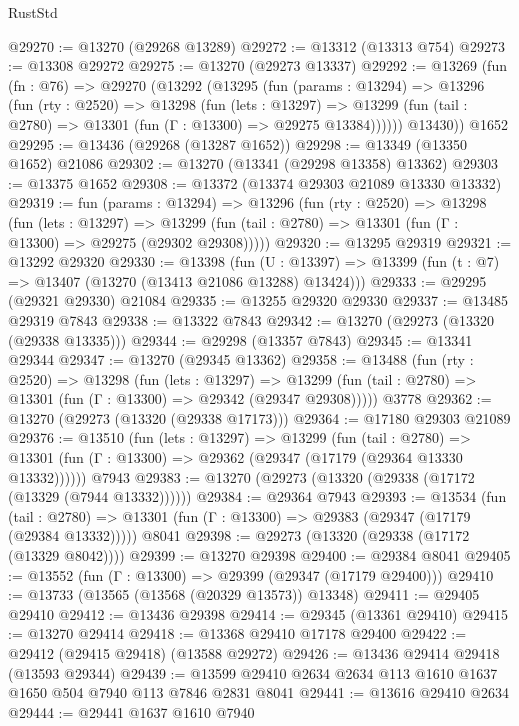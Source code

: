 \begin{lexlean}{RustStd}
\begin{coremodule}
@29270 := @13270 (@29268 @13289)
@29272 := @13312 (@13313 @754)
@29273 := @13308 @29272
@29275 := @13270 (@29273 @13337)
@29292 := @13269
    (fun (fn : @76) =>
    @29270
      (@13292
        (@13295
          (fun (params : @13294) =>
          @13296
            (fun (rty : @2520) =>
            @13298
              (fun (lets : @13297) =>
              @13299 (fun (tail : @2780) => @13301 (fun (Γ : @13300) => @29275 @13384))))))
        @13430))
    @1652
@29295 := @13436 (@29268 (@13287 @1652))
@29298 := @13349 (@13350 @1652) @21086
@29302 := @13270 (@13341 (@29298 @13358) @13362)
@29303 := @13375 @1652
@29308 := @13372 (@13374 @29303 @21089 @13330 @13332)
@29319 := fun (params : @13294) =>
  @13296
    (fun (rty : @2520) =>
    @13298
      (fun (lets : @13297) =>
      @13299 (fun (tail : @2780) => @13301 (fun (Γ : @13300) => @29275 (@29302 @29308)))))
@29320 := @13295 @29319
@29321 := @13292 @29320
@29330 := @13398
    (fun (U : @13397) => @13399 (fun (t : @7) => @13407 (@13270 (@13413 @21086 @13288) @13424)))
@29333 := @29295 (@29321 @29330) @21084
@29335 := @13255 @29320 @29330
@29337 := @13485 @29319 @7843
@29338 := @13322 @7843
@29342 := @13270 (@29273 (@13320 (@29338 @13335)))
@29344 := @29298 (@13357 @7843)
@29345 := @13341 @29344
@29347 := @13270 (@29345 @13362)
@29358 := @13488
    (fun (rty : @2520) =>
    @13298
      (fun (lets : @13297) =>
      @13299 (fun (tail : @2780) => @13301 (fun (Γ : @13300) => @29342 (@29347 @29308)))))
    @3778
@29362 := @13270 (@29273 (@13320 (@29338 @17173)))
@29364 := @17180 @29303 @21089
@29376 := @13510
    (fun (lets : @13297) =>
    @13299
      (fun (tail : @2780) =>
      @13301 (fun (Γ : @13300) => @29362 (@29347 (@17179 (@29364 @13330 @13332))))))
    @7943
@29383 := @13270 (@29273 (@13320 (@29338 (@17172 (@13329 (@7944 @13332))))))
@29384 := @29364 @7943
@29393 := @13534
    (fun (tail : @2780) => @13301 (fun (Γ : @13300) => @29383 (@29347 (@17179 (@29384 @13332)))))
    @8041
@29398 := @29273 (@13320 (@29338 (@17172 (@13329 @8042))))
@29399 := @13270 @29398
@29400 := @29384 @8041
@29405 := @13552 (fun (Γ : @13300) => @29399 (@29347 (@17179 @29400)))
@29410 := @13733 (@13565 (@13568 (@20329 @13573)) @13348)
@29411 := @29405 @29410
@29412 := @13436 @29398
@29414 := @29345 (@13361 @29410)
@29415 := @13270 @29414
@29418 := @13368 @29410 @17178 @29400
@29422 := @29412 (@29415 @29418) (@13588 @29272)
@29426 := @13436 @29414 @29418 (@13593 @29344)
@29439 := @13599 @29410 @2634 @2634 @113 @1610 @1637 @1650 @504 @7940 @113 @7846 @2831 @8041
@29441 := @13616 @29410 @2634
@29444 := @29441 @1637 @1610 @7940

\end{coremodule}
\end{lexlean}
